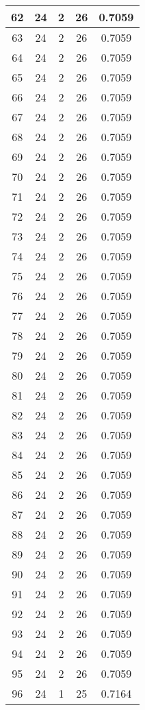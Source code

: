 \documentclass[letterpaper, 12pt]{article}
\begin{document}
\begin{longtable}{|c|c|c|c|c|}
\hline
62 & 24 & 2 & 26 & 0.7059 \\
\hline
63 & 24 & 2 & 26 & 0.7059 \\
\hline
64 & 24 & 2 & 26 & 0.7059 \\
\hline
65 & 24 & 2 & 26 & 0.7059 \\
\hline
66 & 24 & 2 & 26 & 0.7059 \\
\hline
67 & 24 & 2 & 26 & 0.7059 \\
\hline
68 & 24 & 2 & 26 & 0.7059 \\
\hline
69 & 24 & 2 & 26 & 0.7059 \\
\hline
70 & 24 & 2 & 26 & 0.7059 \\
\hline
71 & 24 & 2 & 26 & 0.7059 \\
\hline
72 & 24 & 2 & 26 & 0.7059 \\
\hline
73 & 24 & 2 & 26 & 0.7059 \\
\hline
74 & 24 & 2 & 26 & 0.7059 \\
\hline
75 & 24 & 2 & 26 & 0.7059 \\
\hline
76 & 24 & 2 & 26 & 0.7059 \\
\hline
77 & 24 & 2 & 26 & 0.7059 \\
\hline
78 & 24 & 2 & 26 & 0.7059 \\
\hline
79 & 24 & 2 & 26 & 0.7059 \\
\hline
80 & 24 & 2 & 26 & 0.7059 \\
\hline
81 & 24 & 2 & 26 & 0.7059 \\
\hline
82 & 24 & 2 & 26 & 0.7059 \\
\hline
83 & 24 & 2 & 26 & 0.7059 \\
\hline
84 & 24 & 2 & 26 & 0.7059 \\
\hline
85 & 24 & 2 & 26 & 0.7059 \\
\hline
86 & 24 & 2 & 26 & 0.7059 \\
\hline
87 & 24 & 2 & 26 & 0.7059 \\
\hline
88 & 24 & 2 & 26 & 0.7059 \\
\hline
89 & 24 & 2 & 26 & 0.7059 \\
\hline
90 & 24 & 2 & 26 & 0.7059 \\
\hline
91 & 24 & 2 & 26 & 0.7059 \\
\hline
92 & 24 & 2 & 26 & 0.7059 \\
\hline
93 & 24 & 2 & 26 & 0.7059 \\
\hline
94 & 24 & 2 & 26 & 0.7059 \\
\hline
95 & 24 & 2 & 26 & 0.7059 \\
\hline
96 & 24 & 1 & 25 & 0.7164 \\

\end{longtable}
\end{document}
